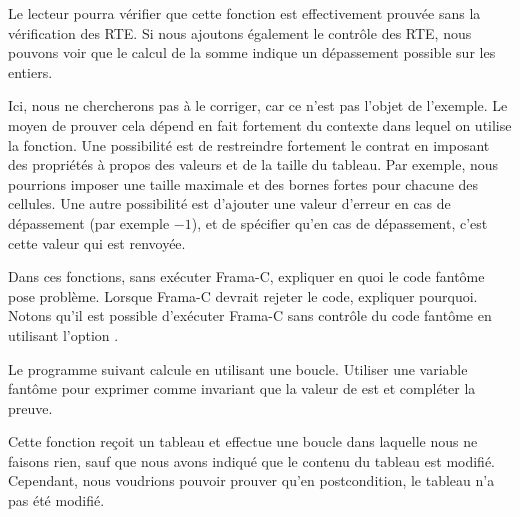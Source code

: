Le lecteur pourra vérifier que cette fonction est effectivement prouvée sans la
vérification des RTE. Si nous ajoutons également le contrôle des RTE, nous pouvons
voir que le calcul de la somme indique un dépassement possible sur les entiers.



Ici, nous ne chercherons pas à le corriger, car ce n'est pas l'objet de l'exemple.
Le moyen de prouver cela dépend en fait fortement du contexte dans lequel on
utilise la fonction. Une possibilité est de restreindre fortement le contrat en
imposant des propriétés à propos des valeurs et de la taille du tableau. Par
exemple, nous pourrions imposer une taille maximale et des bornes fortes pour
chacune des cellules. Une autre possibilité est d'ajouter une valeur d'erreur
en cas de dépassement (par exemple $-1$), et de spécifier qu'en cas de
dépassement, c'est cette valeur qui est renvoyée.







Dans ces fonctions, sans exécuter Frama-C, expliquer en quoi le code fantôme
pose problème. Lorsque Frama-C devrait rejeter le code, expliquer pourquoi.
Notons qu'il est possible d'exécuter Frama-C sans contrôle du code fantôme en
utilisant l'option .








Le programme suivant calcule  en utilisant une boucle.
Utiliser une variable fantôme  pour exprimer comme invariant que
la valeur de  est  et compléter la preuve.








Cette fonction reçoit un tableau et effectue une boucle dans laquelle nous ne
faisons rien, sauf que nous avons indiqué que le contenu du tableau est modifié.
Cependant, nous voudrions pouvoir prouver qu'en postcondition, le tableau n'a
pas été modifié.




